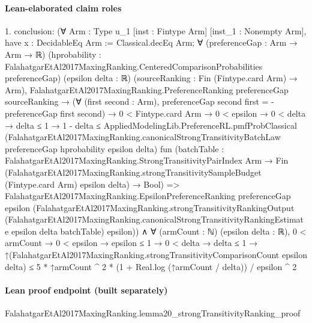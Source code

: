 \documentclass[10pt]{article}
\begin{document}
\paragraph{Lean-elaborated claim roles}\begin{ReviewVerbatim}
1. conclusion: (∀ {Arm : Type u_1} [inst : Fintype Arm] [inst_1 : Nonempty Arm],
    have x : DecidableEq Arm := Classical.decEq Arm;
    ∀ (preferenceGap : Arm → Arm → ℝ)
      (hprobability : FalahatgarEtAl2017MaxingRanking.CenteredComparisonProbabilities preferenceGap) (epsilon delta : ℝ)
      (sourceRanking : Fin (Fintype.card Arm) → Arm),
      FalahatgarEtAl2017MaxingRanking.PreferenceRanking preferenceGap sourceRanking →
        (∀ (first second : Arm), preferenceGap second first = -preferenceGap first second) →
          0 < Fintype.card Arm →
            0 < epsilon →
              0 < delta →
                delta ≤ 1 →
                  1 - delta ≤
                    AppliedModelingLib.PreferenceRL.pmfProbClassical
                      (FalahatgarEtAl2017MaxingRanking.canonicalStrongTransitivityBatchLaw preferenceGap hprobability
                        epsilon delta)
                      fun
                        (batchTable :
                          FalahatgarEtAl2017MaxingRanking.StrongTransitivityPairIndex Arm →
                            Fin
                                (FalahatgarEtAl2017MaxingRanking.strongTransitivitySampleBudget (Fintype.card Arm)
                                  epsilon delta) →
                              Bool) =>
                      FalahatgarEtAl2017MaxingRanking.EpsilonPreferenceRanking preferenceGap epsilon
                        (FalahatgarEtAl2017MaxingRanking.strongTransitivityRankingOutput
                          (FalahatgarEtAl2017MaxingRanking.canonicalStrongTransitivityRankingEstimate epsilon delta
                            batchTable)
                          epsilon)) ∧
  ∀ (armCount : ℕ) (epsilon delta : ℝ),
    0 < armCount →
      0 < epsilon →
        epsilon ≤ 1 →
          0 < delta →
            delta ≤ 1 →
              ↑(FalahatgarEtAl2017MaxingRanking.strongTransitivityComparisonCount epsilon delta) ≤
                5 * ↑armCount ^ 2 * (1 + Real.log (↑armCount / delta)) / epsilon ^ 2
\end{ReviewVerbatim}

\paragraph{Lean proof endpoint (built separately)}\begin{ReviewVerbatim}
FalahatgarEtAl2017MaxingRanking.lemma20_strongTransitivityRanking_proof
\end{ReviewVerbatim}
\end{document}
